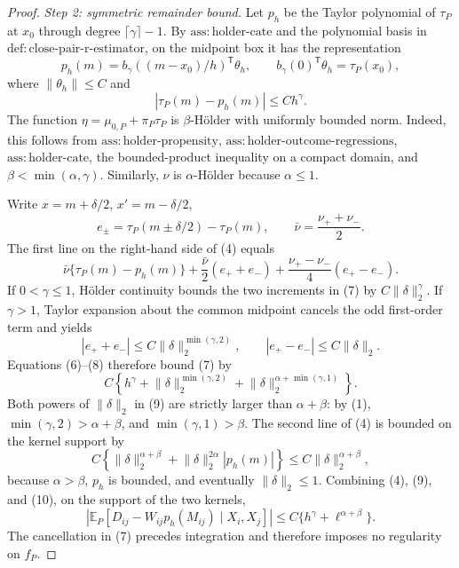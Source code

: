 \documentclass{article}
\begin{document}
\begin{proof}
\emph{Step 2: symmetric remainder bound.}
Let \(p_h\) be the Taylor polynomial of \(\tau_P\) at \(x_0\) through degree \(\lceil\gamma\rceil-1\).  By \(\mathrm{ass:holder\mbox{-}cate}\) and the polynomial basis in \(\mathrm{def:close\mbox{-}pair\mbox{-}r\mbox{-}estimator}\), on the midpoint box it has the representation
\[
p_h(m)=b_\gamma((m-x_0)/h)^{\mathsf T}\theta_h,
\qquad
b_\gamma(0)^{\mathsf T}\theta_h=\tau_P(x_0),
\tag{5}
\]
where \(\lVert\theta_h\rVert\leq C\) and
\[
|\tau_P(m)-p_h(m)|\leq Ch^\gamma.
\tag{6}
\]
The function \(\eta=\mu_{0,P}+\pi_P\tau_P\) is \(\beta\)-H\"older with uniformly bounded norm.  Indeed, this follows from \(\mathrm{ass:holder\mbox{-}propensity}\), \(\mathrm{ass:holder\mbox{-}outcome\mbox{-}regressions}\), \(\mathrm{ass:holder\mbox{-}cate}\), the bounded-product inequality on a compact domain, and \(\beta<\min(\alpha,\gamma)\).  Similarly, \(\nu\) is \(\alpha\)-H\"older because \(\alpha\leq1\).

Write \(x=m+\delta/2\), \(x'=m-\delta/2\),
\[
e_\pm=\tau_P(m\pm\delta/2)-\tau_P(m),
\qquad \bar\nu=\frac{\nu_++\nu_-}{2}.
\]
The first line on the right-hand side of (4) equals
\[
\bar\nu\{\tau_P(m)-p_h(m)\}
+\frac{\bar\nu}{2}(e_++e_-)
+\frac{\nu_+-\nu_-}{4}(e_+-e_-).
\tag{7}
\]
If \(0<\gamma\leq1\), H\"older continuity bounds the two increments in (7) by \(C\lVert\delta\rVert_2^\gamma\).  If \(\gamma>1\), Taylor expansion about the common midpoint cancels the odd first-order term and yields
\[
|e_++e_-|\leq C\lVert\delta\rVert_2^{\min(\gamma,2)},
\qquad
|e_+-e_-|\leq C\lVert\delta\rVert_2.
\tag{8}
\]
Equations (6)--(8) therefore bound (7) by
\[
C\left\{
h^\gamma+\lVert\delta\rVert_2^{\min(\gamma,2)}
+\lVert\delta\rVert_2^{\alpha+\min(\gamma,1)}
\right\}.
\tag{9}
\]
Both powers of \(\lVert\delta\rVert_2\) in (9) are strictly larger than \(\alpha+\beta\): by (1), \(\min(\gamma,2)>\alpha+\beta\), and \(\min(\gamma,1)>\beta\).  The second line of (4) is bounded on the kernel support by
\[
C\left\{
\lVert\delta\rVert_2^{\alpha+\beta}
+\lVert\delta\rVert_2^{2\alpha}|p_h(m)|
\right\}
\leq C\lVert\delta\rVert_2^{\alpha+\beta},
\tag{10}
\]
because \(\alpha>\beta\), \(p_h\) is bounded, and eventually \(\lVert\delta\rVert_2\leq1\).  Combining (4), (9), and (10), on the support of the two kernels,
\[
\left|\mathbb E_P[D_{ij}-W_{ij}p_h(M_{ij})\mid X_i,X_j]\right|
\leq C\{h^\gamma+\ell^{\alpha+\beta}\}.
\tag{11}
\]
The cancellation in (7) precedes integration and therefore imposes no regularity on \(f_P\).


\end{proof}
\end{document}

